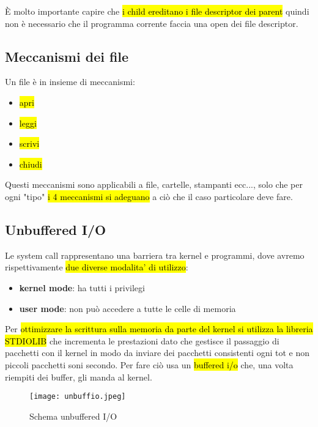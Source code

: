 È molto importante capire che \hl{ i child ereditano i file descriptor dei parent} quindi non è necessario che il programma corrente faccia una open dei file descriptor.


\subsection{Meccanismi dei file}

Un file è in insieme di meccanismi: 

\begin{itemize}
	\item \hl{apri}
	\item \hl{leggi}
	\item \hl{scrivi}
	\item \hl{chiudi}
\end{itemize}


Questi meccanismi sono applicabili a file, cartelle, stampanti ecc..., solo che per ogni "tipo" \hl{i 4 meccanismi si adeguano} a ciò che il caso particolare deve fare.


\subsection{Unbuffered I/O}

Le system call rappresentano una barriera tra kernel e programmi, dove avremo rispettivamente \hl{due diverse modalita' di utilizzo}:

\begin{itemize}
	\item \textbf{kernel mode}: ha tutti i privilegi
	\item \textbf{user mode}: non può accedere a tutte le celle di memoria
\end{itemize}


Per \hl{ottimizzare la scrittura sulla memoria da parte del kernel si utilizza la libreria STDIOLIB} che incrementa le prestazioni dato che gestisce il passaggio di pacchetti con il kernel in modo da inviare dei pacchetti consistenti ogni tot e non piccoli pacchetti soni secondo. Per fare ciò usa un \hl{buffered i/o} che, una volta riempiti dei buffer, gli manda al kernel.


\begin{figure}[H]
\centering
\texttt{[image: unbuffio.jpeg]}
\caption{Schema unbuffered I/O} 
\label{unbuffio}
\end{figure}




